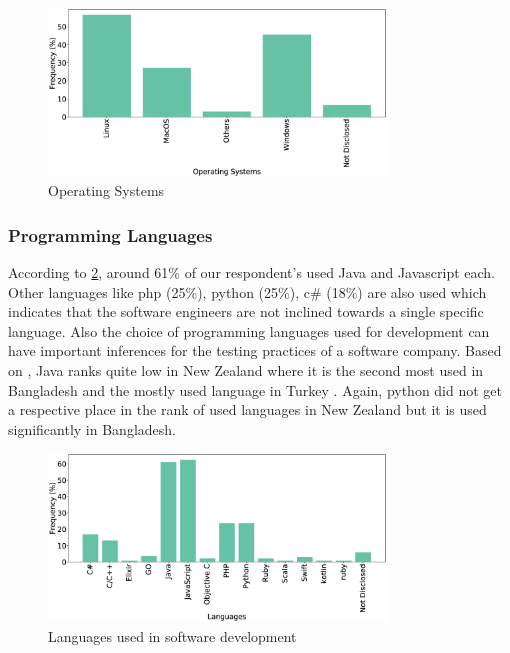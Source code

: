 \begin{figure}[htbp]
\centering
  \includegraphics[width=0.8\textwidth]{Figures/Respondents_os}
  \caption{Operating Systems}
  \label{fig:os}
\end{figure}

\subsubsection{Programming Languages}
According to \ref{fig:languages}, around 61\% of our respondent's used Java and Javascript each. Other languages like php (25\%), python (25\%), c\# (18\%) are also used which indicates that the software engineers are not inclined towards a single specific language. Also the choice of programming languages used for development can have important inferences for the testing practices of a software company. Based on \cite{Wang2018}, Java ranks quite low in New Zealand where it is the second most used in Bangladesh and the mostly used language in Turkey \cite{Garousi2015}. Again, python did not get a respective place in the rank of used languages in New Zealand but it is used significantly in Bangladesh.

\begin{figure}[htbp]
\centering
  \includegraphics[width=0.8\textwidth]{Figures/Respondents_languages}
  \caption{Languages used in software development}
  \label{fig:languages}
\end{figure}

